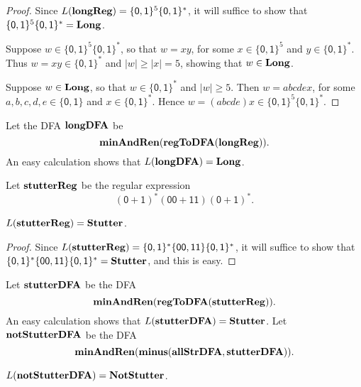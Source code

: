 \begin{proof}
Since $L(\mathbf{longReg})=\{\mathsf{0,1}\}^5\{\mathsf{0,1}\}^*$,
it will suffice to show that 
$\{\mathsf{0,1}\}^5\{\mathsf{0,1}\}^* = \mathbf{Long}$.

Suppose $w\in\{\mathsf{0,1}\}^5\{\mathsf{0,1}\}^*$, so that
$w=xy$, for some $x\in\{\mathsf{0,1}\}^5$ and $y\in
\{\mathsf{0,1}\}^*$.  Thus $w=xy\in\{\mathsf{0,1}\}^*$
and $|w|\geq|x|=5$, showing that $w\in\mathbf{Long}$.

Suppose $w\in\mathbf{Long}$, so that $w\in\{\mathsf{0,1}\}^*$ and
$|w|\geq 5$.  Then $w=abcdex$, for some $a,b,c,d,e\in\{\mathsf{0,1}\}$
and $x\in\{\mathsf{0,1}\}^*$.  Hence $w=(abcde)x\in
\{\mathsf{0,1}\}^5\{\mathsf{0,1}\}^*$.
\end{proof}

Let the DFA $\mathbf{longDFA}$ be
\begin{displaymath}
\mathbf{minAndRen}(\mathbf{regToDFA}(\mathbf{longReg})) .
\end{displaymath}
An easy calculation shows that $L(\mathbf{longDFA}) = \mathbf{Long}$.

Let $\mathbf{stutterReg}$ be the regular expression
\begin{displaymath}
\mathsf{(0+1)^*(00+11)(0 + 1)^*} .
\end{displaymath}

\begin{lemma}
\label{Stutter7}
$L(\mathbf{stutterReg}) = \mathbf{Stutter}$.
\end{lemma}

\begin{proof}
Since $L(\mathbf{stutterReg})=
\{\mathsf{0,1}\}^*\{\mathsf{00,11}\}\{\mathsf{0,1}\}^*$,
it will suffice to show that
$\{\mathsf{0,1}\}^*\{\mathsf{00,11}\}\{\mathsf{0,1}\}^* = \mathbf{Stutter}$,
and this is easy.
\end{proof}

Let $\mathbf{stutterDFA}$ be the DFA
\begin{displaymath}
\mathbf{minAndRen}(\mathbf{regToDFA}(\mathbf{stutterReg})) .
\end{displaymath}
An easy calculation shows that $L(\mathbf{stutterDFA}) = \mathbf{Stutter}$.
Let $\mathbf{notStutterDFA}$ be the DFA
%
%
\begin{displaymath}
\mathbf{minAndRen}(\mathbf{minus}(\mathbf{allStrDFA}, \mathbf{stutterDFA})) .
\end{displaymath}

\begin{lemma}
\label{Stutter8}
$L(\mathbf{notStutterDFA}) = \mathbf{NotStutter}$.
\end{lemma}

